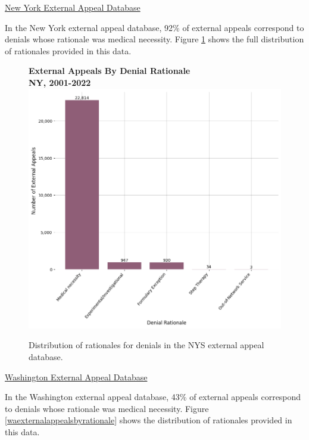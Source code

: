 \documentclass[12pt, a4paper,twoside,parskip=full]{report}
\theoremstyle{plain} %
\theoremstyle{definition} %
\theoremstyle{remark} %
\numberwithin{equation}{chapter}
\begin{document}
		\clearpage
	
	
		\underline{New York External Appeal Database}

		In the New York external appeal database, 92\% of external appeals correspond to denials whose rationale was medical necessity. Figure \ref{nyexternalappealsbyrationale} shows the full distribution of rationales provided in this data.
		
		\begin{figure}[h!]
			\centering
			\textbf{External Appeals By Denial Rationale}\\
			\textbf{NY, 2001-2022}\\
			\includegraphics[width=.8\textwidth]{images/nys_external/external_appeals_by_denial_reason.png}
			\caption{Distribution of rationales for denials in the NYS external appeal database.}
			\label{nyexternalappealsbyrationale}
		\end{figure}
	
		\clearpage
	
	
		\underline{Washington External Appeal Database}

		In the Washington external appeal database, 43\% of external appeals correspond to denials whose rationale was medical necessity. Figure \ref{waexternalappealsbyrationale} shows the distribution of rationales provided in this data.
		
\end{document}
